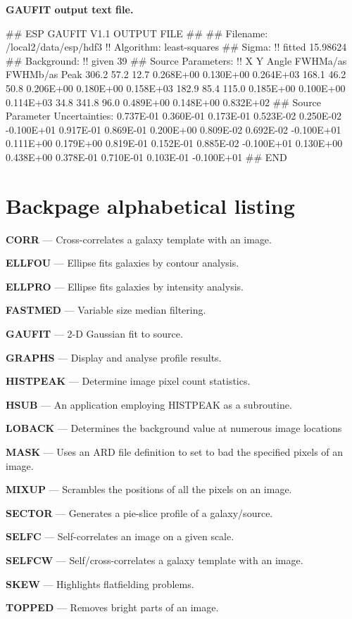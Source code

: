 \documentclass[twoside,11pt]{starlink}
\begin{document}
\bf{GAUFIT} output text file.

\begin{terminalv}
## ESP GAUFIT V1.1 OUTPUT FILE
##
## Filename:
/local2/data/esp/hdf3
!! Algorithm: least-squares
## Sigma:
!! fitted
15.98624
## Background:
!! given
39
## Source Parameters:
!!  X           Y         Angle       FWHMa/as     FWHMb/as      Peak
      306.2        57.2        12.7   0.268E+00    0.130E+00    0.264E+03
      168.1        46.2        50.8   0.206E+00    0.180E+00    0.158E+03
      182.9        85.4       115.0   0.185E+00    0.100E+00    0.114E+03
       34.8       341.8        96.0   0.489E+00    0.148E+00    0.832E+02
## Source Parameter Uncertainties:
  0.737E-01   0.360E-01   0.173E-01   0.523E-02    0.250E-02   -0.100E+01
  0.917E-01   0.869E-01   0.200E+00   0.809E-02    0.692E-02   -0.100E+01
  0.111E+00   0.179E+00   0.819E-01   0.152E-01    0.885E-02   -0.100E+01
  0.130E+00   0.438E+00   0.378E-01   0.710E-01    0.103E-01   -0.100E+01
## END
\end{terminalv}


\newpage
\section{Backpage alphabetical listing}
\label{app:backpage}

\textbf{CORR}{ --- Cross-correlates a galaxy template with an image.}
\pageref{des:CORR}

\textbf{ELLFOU}{ --- Ellipse fits galaxies by contour analysis.}
\pageref{des:ELLFOU}

\textbf{ELLPRO}{ --- Ellipse fits galaxies by intensity analysis.}
\pageref{des:ELLPRO}

\textbf{FASTMED}{ --- Variable size median filtering.}
\pageref{des:FASTMED}

\textbf{GAUFIT}{ --- 2-D Gaussian fit to source.}
\pageref{des:GAUFIT}

\textbf{GRAPHS}{ --- Display and analyse profile results.}
\pageref{des:GRAPHS}

\textbf{HISTPEAK}{ --- Determine image pixel count statistics.}
\pageref{des:HISTPEAK}

\textbf{HSUB}{ --- An application employing HISTPEAK as a subroutine.}
\pageref{des:HSUB}

\textbf{LOBACK}{ --- Determines the background value at numerous image locations}
\pageref{des:LOBACK}

\textbf{MASK}{ --- Uses an ARD file definition to set to bad the specified pixels
of an image.}
\pageref{des:MASK}

\textbf{MIXUP}{ --- Scrambles the positions of all the pixels on an image.}
\pageref{des:MIXUP}

\textbf{SECTOR}{ --- Generates a pie-slice profile of a galaxy/source.}
\pageref{des:SECTOR}

\textbf{SELFC}{ --- Self-correlates an image on a given scale.}
\pageref{des:SELFC}

\textbf{SELFCW}{ --- Self/cross-correlates a galaxy template with an image.}
\pageref{des:SELFCW}

\textbf{SKEW}{ --- Highlights flatfielding problems.}
\pageref{des:SKEW}

\textbf{TOPPED}{ --- Removes bright parts of an image.}
\pageref{des:TOPPED}
\end{document}
